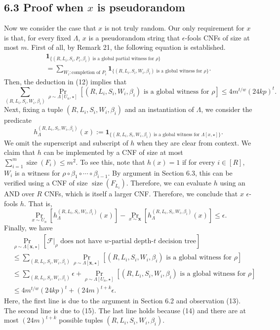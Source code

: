 \subsection*{6.3 Proof when $x$ is pseudorandom}
Now we consider the case that $x$ is not truly random. Our only requirement for $x$ is that, for every fixed $\Lambda$, $x$ is a pseudorandom string that $\epsilon$-fools CNFs of size at most $m$. First of all, by Remark 21, the following equation is established.
\begin{multline*}\mathbf1_{\{(R,L_i,S_i,P_i,\beta_i)\text{ is a global partial witness for }\rho\}}\\=\sum_{W_i:\text{completion of }P_i}\mathbf1_{\{(R,L_i,S_i,W_i,\beta_i)\text{ is a global witness for }\rho\}}.\tag{13}\end{multline*}
Then, the deduction in (12) implies that
\[\sum_{(R,L_i,S_i,W_i,\beta_i)}\Pr_{\rho\sim\Lambda[U_n,\star]}[(R,L_i,S_i,W_i,\beta_i)\text{ is a global witness for }\rho]\le4m^{t/w}(24kp)^t.\tag{14}\]
Next, fixing a tuple $(R,L_i,S_i,W_i,\beta_i)$ and an instantiation of $\Lambda$, we consider the predicate
\[h_\Lambda^{(R,L_i,S_i,W_i,\beta_i)}(x):=\mathbf1_{\{(R,L_i,S_i,W_i,\beta_i)\text{ is a global witness for }\Lambda[x,\star]\}}.\]
We omit the superscript and subscript of $h$ when they are clear from context. We claim that $h$ can be implemented by a CNF of size at most $\sum_{i=1}^m\operatorname{size}(F_i)\le m^2$. To see this, note that $h(x)=1$ if for every $i\in[R]$, $W_i$ is a witness for $\rho\circ\beta_1\circ\cdots\circ\beta_{i-1}$. By argument in Section 6.3, this can be verified using a CNF of size $\operatorname{size}(F_{L_i})$. Therefore, we can evaluate $h$ using an AND over $R$ CNFs, which is itself a larger CNF. Therefore, we conclude that $x$ $\epsilon$-fools $h$. That is,
\[\Pr_{x\sim U_n}[h_\Lambda^{(R,L_i,S_i,W_i,\beta_i)}(x)]-\Pr_{x\sim\boldsymbol x}[h_\Lambda^{(R,L_i,S_i,W_i,\beta_i)}(x)]\le\epsilon.\tag{15}\]
Finally, we have
\begin{align*}&\Pr_{\rho\sim\Lambda[\boldsymbol x,\star]}[\mathcal F|_\rho\text{ does not have }w\text{-partial depth-}t\text{ decision tree}]\\&\le\sum_{(R,L_i,S_i,W_i,\beta_i)}\Pr_{\rho\sim\Lambda[\boldsymbol x,\star]}[(R,L_i,S_i,W_i,\beta_i)\text{ is a global witness for }\rho]\\&\le\sum_{(R,L_i,S_i,W_i,\beta_i)}\epsilon+\Pr_{\rho\sim\Lambda[U_n,\star]}[(R,L_i,S_i,W_i,\beta_i)\text{ is a global witness for }\rho]\\&\le4m^{t/w}(24kp)^t+(24m)^{t+k}\epsilon.\end{align*}
Here, the first line is due to the argument in Section 6.2 and observation (13). The second line is due to (15). The last line holds because (14) and there are at most $(24m)^{t+k}$ possible tuples $(R,L_i,S_i,W_i,\beta_i)$.

